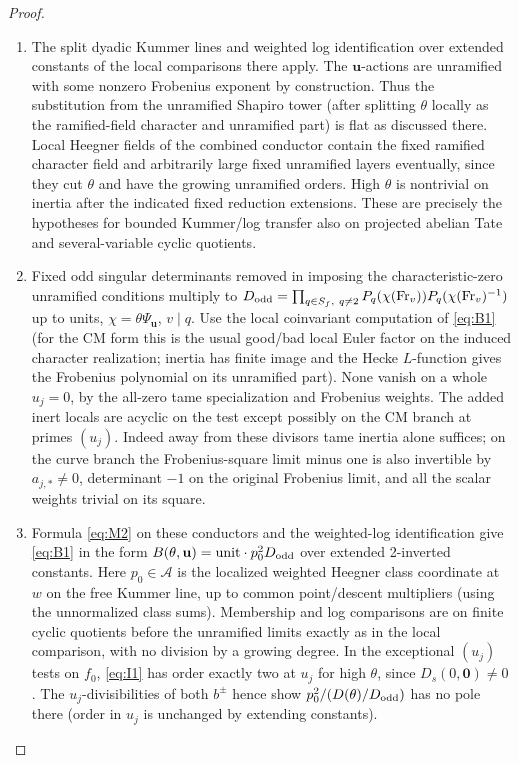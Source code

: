 \begin{proof}
\begin{enumerate}[label=\textup{(\roman*)}]
\item The split dyadic Kummer lines and weighted log identification over extended constants of the local comparisons there apply. The \(\mathbf u\)-actions are unramified with some nonzero Frobenius exponent by construction. Thus the substitution from the unramified Shapiro tower (after splitting \(\theta\) locally as the ramified-field character and unramified part) is flat as discussed there. Local Heegner fields of the combined conductor contain the fixed ramified character field and arbitrarily large fixed unramified layers eventually, since they cut \(\theta\) and have the growing unramified orders. High \(\theta\) is nontrivial on inertia after the indicated fixed reduction extensions. These are precisely the hypotheses for bounded Kummer/log transfer also on projected abelian Tate and several-variable cyclic quotients.
\item Fixed odd singular determinants removed in imposing the characteristic-zero unramified conditions multiply to \(D_{\rm odd}=\prod_{q\in S_f,\ q\ne2}P_q(\chi(\mathrm{Fr}_v))P_q(\chi(\mathrm{Fr}_v)^{-1})\) up to units, \(\chi=\theta\Psi_{\mathbf u}\), \(v\mid q\). Use the local coinvariant computation of \eqref{eq:B1} (for the CM form this is the usual good/bad local Euler factor on the induced character realization; inertia has finite image and the Hecke \(L\)-function gives the Frobenius polynomial on its unramified part). None vanish on a whole \(u_j=0\), by the all-zero tame specialization and Frobenius weights. The added inert locals are acyclic on the test except possibly on the CM branch at primes \((u_j)\). Indeed away from these divisors tame inertia alone suffices; on the curve branch the Frobenius-square limit minus one is also invertible by \(a_{j,*}\ne0\), determinant \(-1\) on the original Frobenius limit, and all the scalar weights trivial on its square.
\item Formula \eqref{eq:M2} on these conductors and the weighted-log identification give \eqref{eq:B1} in the form \(B(\theta,\mathbf u)=\mathrm{unit}\cdot p_0^2 D_{\rm odd}\) over extended 2-inverted constants. Here \(p_0\in\mathscr A\) is the localized weighted Heegner class coordinate at \(w\) on the free Kummer line, up to common point/descent multipliers (using the unnormalized class sums). Membership and log comparisons are on finite cyclic quotients before the unramified limits exactly as in the local comparison, with no division by a growing degree. In the exceptional \((u_j)\) tests on \(f_0\), \eqref{eq:I1} has order exactly two at \(u_j\) for high \(\theta\), since \(D_s(0,\mathbf0)\ne0\). The \(u_j\)-divisibilities of both \(b^\pm\) hence show \(p_0^2/(D(\theta)/D_{\rm odd})\) has no pole there (order in \(u_j\) is unchanged by extending constants).


\end{enumerate}
\end{proof}
